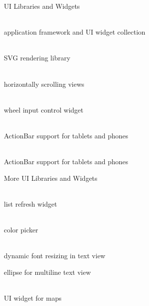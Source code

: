 \documentclass[aspectratio=169]{beamer}
\newcommand{\surl}[1] {{\tiny \url{#1}}}
\begin{document}
    \begin{frame}{UI Libraries and Widgets}
      \begin{description}
        \item<1->[GreenDroid \surl{https://github.com/cyrilmottier/GreenDroid}] \hfill \\ application framework and UI widget collection
        \item<2->[svg-android \surl{http://code.google.com/p/svg-android/}] \hfill \\ SVG rendering library
        \item<3->[View Flow for Android \surl{https://github.com/pakerfeldt/android-viewflow}] \hfill \\ horizontally scrolling views
        \item<4->[Android Wheel \surl{http://code.google.com/p/android-wheel/}] \hfill \\ wheel input control widget
        \item<5->[ActionBarSherlock \surl{http://actionbarsherlock.com/}]  \hfill \\ ActionBar support for tablets and phones
        \item<6->[Android Actionbar \surl{https://github.com/johannilsson/android-actionbar}] \hfill \\ ActionBar support for tablets and phones
      \end{description}
    \end{frame}

    \begin{frame}{More UI Libraries and Widgets}
      \begin{description}        
        \item<1->[Pull to Refresh for Android \surl{https://github.com/johannilsson/android-pulltorefresh}] \hfill \\ list refresh widget
        \item<2->[Android ColorPickerPreference \surl{https://github.com/attenzione/android-ColorPickerPreference}] \hfill \\ color picker
        \item<3->[Android AutoFitTextView \surl{https://github.com/grantland/android-autofittextview}] \hfill \\ dynamic font resizing in text view
        \item<4->[Android TextView Multiline Ellipse \surl{http://code.google.com/p/android-textview-multiline-ellipse/}] ellipse for multiline text view
        \item<5->[Android MapViewBalloons \surl{https://github.com/jgilfelt/android-mapviewballoons}] \hfill \\ UI widget for maps
      \end{description}
    \end{frame}
\end{document}
